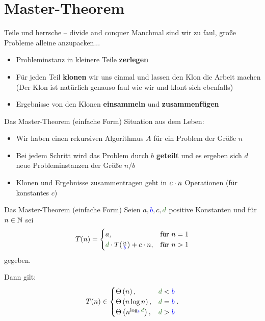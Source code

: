 \section{Master-Theorem}

\begin{frame}{Teile und herrsche -- divide and conquer}
	Manchmal sind wir zu faul, große Probleme alleine anzupacken...
	\begin{itemize}
		\item Probleminstanz in kleinere Teile \textbf{zerlegen}
		\item Für jeden Teil \textbf{klonen} wir uns einmal und lassen den Klon die Arbeit machen \\
		{\small (Der Klon ist natürlich genauso faul wie wir und klont sich ebenfalls)}
		\item Ergebnisse von den Klonen \textbf{einsammeln} und \textbf{zusammenfügen}
	\end{itemize}
\end{frame}

\begin{frame}{Das Master-Theorem (einfache Form)}
	Situation aus dem Leben: 
	\begin{itemize}[<+->]
		\item Wir haben einen rekursiven Algorithmus $A$ für ein Problem der Größe $n$
		\item Bei jedem Schritt wird das Problem durch $b$ \textbf{geteilt} und es ergeben sich $d$ neue Probleminstanzen der Größe $n/b$
		\item Klonen und Ergebnisse zusammentragen geht in $c \cdot n$ Operationen (für konstantes $c$)
	\end{itemize}
\end{frame}

\begin{frame}{Das Master-Theorem (einfache Form)}  %
	Seien $a, \textcolor{blue}{b}, c, \textcolor{darkgreen}{d}$ positive Konstanten und für $n \in \mathbb{N}$ sei 
	\[
	T(n) = 
	\begin{cases}
	a,  & \text{für } n = 1 \\
	\textcolor{darkgreen}{d} \cdot T\large(\frac{n}{\textcolor{blue}{b}}\large) + c\·n, & \text{für } n > 1
	\end{cases}
	\]
	gegeben. \\ \smallskip
	
	Dann gilt:
	\[
	T(n) \in 
	\begin{cases}
	\Th{n},                                                        & \textcolor{darkgreen}{d} < \textcolor{blue}{b} \\
	\Th{n \log n},                                                 & \textcolor{darkgreen}{d} = \textcolor{blue}{b} \\
	\Th{n^{\log _{\textcolor{blue}{b}} \textcolor{darkgreen}{d}}}, & \textcolor{darkgreen}{d} > \textcolor{blue}{b}
	\end{cases}.
	\]
\end{frame}

